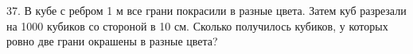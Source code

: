 37. В кубе с ребром 1 м все грани покрасили в разные цвета. Затем куб разрезали на 1000 кубиков со стороной в 10 см. Сколько получилось кубиков, у которых ровно две грани окрашены в разные цвета?\\
